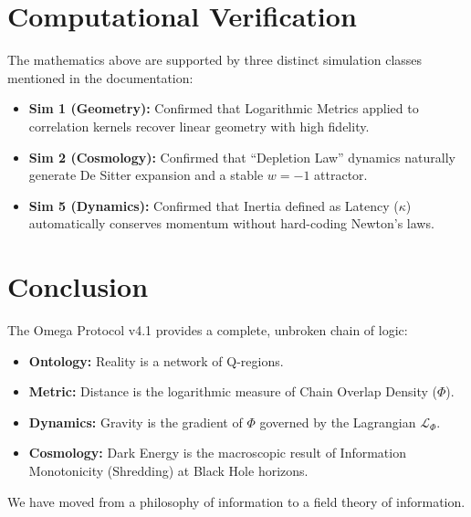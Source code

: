 \documentclass{article}
\begin{document}
\section{Computational Verification}
The mathematics above are supported by three distinct simulation classes mentioned in the documentation:
\begin{itemize}
    \item \textbf{Sim 1 (Geometry):} Confirmed that Logarithmic Metrics applied to correlation kernels recover linear geometry with high fidelity.
    \item \textbf{Sim 2 (Cosmology):} Confirmed that ``Depletion Law'' dynamics naturally generate De Sitter expansion and a stable $w=-1$ attractor.
    \item \textbf{Sim 5 (Dynamics):} Confirmed that Inertia defined as Latency ($\kappa$) automatically conserves momentum without hard-coding Newton's laws.
\end{itemize}

\section{Conclusion}
The Omega Protocol v4.1 provides a complete, unbroken chain of logic:
\begin{itemize}
    \item \textbf{Ontology:} Reality is a network of Q-regions.
    \item \textbf{Metric:} Distance is the logarithmic measure of Chain Overlap Density ($\Phi$).
    \item \textbf{Dynamics:} Gravity is the gradient of $\Phi$ governed by the Lagrangian $\mathcal{L}_\Phi$.
    \item \textbf{Cosmology:} Dark Energy is the macroscopic result of Information Monotonicity (Shredding) at Black Hole horizons.
\end{itemize}
We have moved from a philosophy of information to a field theory of information.
\end{document}
